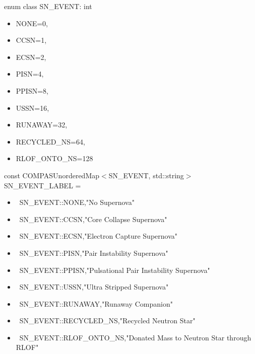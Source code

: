 \hfill
\begin{minipage}{\dimexpr\textwidth-2em}
    enum class SN\_EVENT: int \lcb
    \begin{itemize}
        \item[]{NONE\tabto{8em}=\tabto{9.5em}0,}
        \item[]{CCSN\tabto{8em}=\tabto{9.5em}1,}
        \item[]{ECSN\tabto{8em}=\tabto{9.5em}2,}
        \item[]{PISN\tabto{8em}=\tabto{9.5em}4,}
        \item[]{PPISN\tabto{8em}=\tabto{9.5em}8,}
        \item[]{USSN\tabto{8em}=\tabto{9.5em}16,}
        \item[]{RUNAWAY\tabto{8em}=\tabto{9.5em}32,}
        \item[]{RECYCLED\_NS\tabto{8em}=\tabto{9.5em}64,}
        \item[]{RLOF\_ONTO\_NS\tabto{8em}=\tabto{9.5em}128}
        \end{itemize}
    \rcb{;}

    \bigskip
    const COMPASUnorderedMap$<$SN\_EVENT, std::string$>$ SN\_EVENT\_LABEL = \lcb
    \begin{itemize}
        \item[]{\lcb\ SN\_EVENT::NONE,\tabto{14.0em}"No Supernova"\ \rcb{,}}
        \item[]{\lcb\ SN\_EVENT::CCSN,\tabto{14.0em}"Core Collapse Supernova"\ \rcb{,}}
        \item[]{\lcb\ SN\_EVENT::ECSN,\tabto{14.0em}"Electron Capture Supernova"\ \rcb{,}}
        \item[]{\lcb\ SN\_EVENT::PISN,\tabto{14.0em}"Pair Instability Supernova"\ \rcb{,}}
        \item[]{\lcb\ SN\_EVENT::PPISN,\tabto{14.0em}"Pulsational Pair Instability Supernova"\ \rcb{,}}
        \item[]{\lcb\ SN\_EVENT::USSN,\tabto{14.0em}"Ultra Stripped Supernova"\ \rcb{,}}
        \item[]{\lcb\ SN\_EVENT::RUNAWAY,\tabto{14.0em}"Runaway Companion"\ \rcb{,}}
        \item[]{\lcb\ SN\_EVENT::RECYCLED\_NS,\tabto{14.0em}"Recycled Neutron Star"\ \rcb{,}}
        \item[]{\lcb\ SN\_EVENT::RLOF\_ONTO\_NS,\tabto{14.0em}"Donated Mass to Neutron Star through RLOF"\ \rcb}
    \end{itemize}
    \rcb{;}
\end{minipage}

